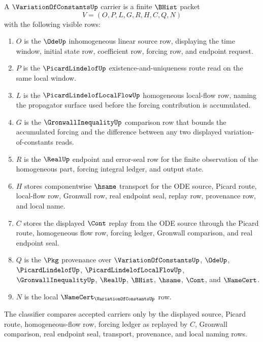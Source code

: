 \begin{definition}
\label{def:variation-of-constants-carrier}
A $\VariationOfConstantsUp$ carrier is a finite $\BHist$ packet
$$
V=(O,P,L,G,R,H,C,Q,N)
$$
with the following visible rows:
\begin{enumerate}
\item $O$ is the $\OdeUp$ inhomogeneous linear source row, displaying the time window, initial state row, coefficient row, forcing row, and endpoint request.
\item $P$ is the $\PicardLindelofUp$ existence-and-uniqueness route read on the same local window.
\item $L$ is the $\PicardLindelofLocalFlowUp$ homogeneous local-flow row, naming the propagator surface used before the forcing contribution is accumulated.
\item $G$ is the $\GronwallInequalityUp$ comparison row that bounds the accumulated forcing and the difference between any two displayed variation-of-constants reads.
\item $R$ is the $\RealUp$ endpoint and error-seal row for the finite observation of the homogeneous part, forcing integral ledger, and output state.
\item $H$ stores componentwise $\hsame$ transport for the ODE source, Picard route, local-flow row, Gronwall row, real endpoint seal, replay row, provenance row, and local name.
\item $C$ stores the displayed $\Cont$ replay from the ODE source through the Picard route, homogeneous flow row, forcing ledger, Gronwall comparison, and real endpoint seal.
\item $Q$ is the $\Pkg$ provenance over $\VariationOfConstantsUp$, $\OdeUp$, $\PicardLindelofUp$, $\PicardLindelofLocalFlowUp$, $\GronwallInequalityUp$, $\RealUp$, $\BHist$, $\hsame$, $\Cont$, and $\NameCert$.
\item $N$ is the local $\NameCert_{\VariationOfConstantsUp}$ row.
\end{enumerate}
The classifier compares accepted carriers only by the displayed source, Picard route, homogeneous-flow row, forcing ledger as replayed by $C$, Gronwall comparison, real endpoint seal, transport, provenance, and local naming rows.
\end{definition}

